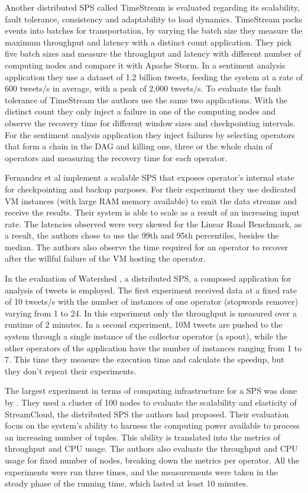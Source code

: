 \documentclass[ppgc,diss,english]{iiufrgs}
\begin{document}
Another distributed SPS called TimeStream \cite{qian2013timestream} is evaluated regarding its scalability, fault tolerance, consistency and adaptability to load dynamics. TimeStream packs events into batches for transportation, by varying the batch size they measure the maximum throughput and latency with a distinct count application. They pick five batch sizes and measure the throughput and latency with different number of computing nodes and compare it with Apache Storm. In a sentiment analysis application they use a dataset of 1.2 billion tweets, feeding the system at a rate of 600 tweets/s in average, with a peak of 2,000 tweets/s. To evaluate the fault tolerance of TimeStream the authors use the same two applications. With the distinct count they only inject a failure in one of the computing nodes and observe the recovery time for different window sizes and checkpointing intervals. For the sentiment analysis application they inject failures by selecting operators that form a chain in the DAG and killing one, three or the whole chain of operators and measuring the recovery time for each operator.

Fernandez et al \cite{castro2013integrating} implement a scalable SPS that exposes operator's internal state for checkpointing and backup purposes. For their experiment they use dedicated VM instances (with large RAM memory available) to emit the data streams and receive the results. Their system is able to scale as a result of an increasing input rate. The latencies observed were very skewed for the Linear Road Benchmark, as a result, the authors chose to use the 99th and 95th percentiles, besides the median. The authors also observe the time required for an operator to recover after the willful failure of the VM hosting the operator.

In the evaluation of Watershed \cite{de2011watershed}, a distributed SPS, a composed application for analysis of tweets is employed. The first experiment received data at a fixed rate of 10 tweets/s with the number of instances of one operator (stopwords remover) varying from 1 to 24. In this experiment only the throughput is measured over a runtime of 2 minutes. In a second experiment, 10M tweets are pushed to the system through a single instance of the collector operator (a spout), while the other operators of the application have the number of instances ranging from 1 to 7. This time they measure the execution time and calculate the speedup, but they don't repeat their experiments.

The largest experiment in terms of computing infrastructure for a SPS was done by \cite{gulisano2012streamcloud}. They used a cluster of 100 nodes to evaluate the scalability and elasticity of StreamCloud, the distributed SPS the authors had proposed. Their evaluation focus on the system's ability to harness the computing power available to process an increasing number of tuples. This ability is translated into the metrics of throughput and CPU usage. The authors also evaluate the throughput and CPU usage for fixed number of nodes, breaking down the metrics per operator. All the experiments were run three times, and the measurements were taken in the steady phase of the running time, which lasted at least 10 minutes.
\end{document}

